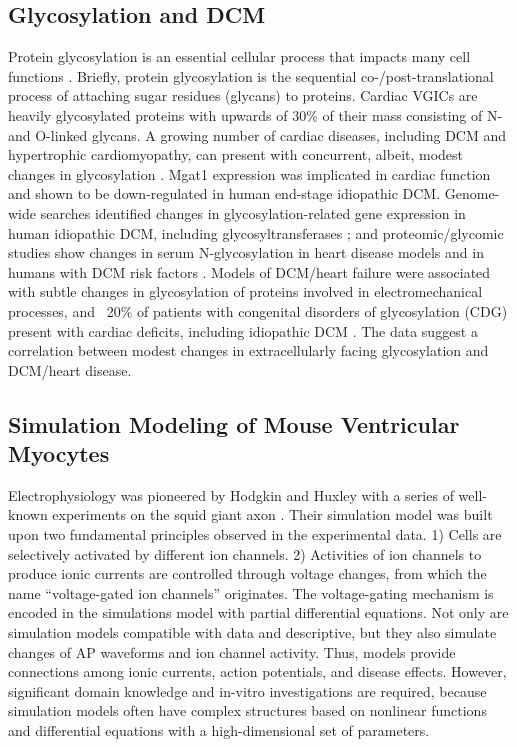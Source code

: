 \documentclass[10pt,letterpaper]{article}
\begin{document}
\subsection*{Glycosylation and DCM}
Protein glycosylation is an essential cellular process that impacts many cell functions \cite{marques2017cardiac}. Briefly, protein glycosylation is the sequential co-/post-translational process of attaching sugar residues (glycans) to proteins. Cardiac VGICs are heavily glycosylated proteins with upwards of 30\% of their mass consisting of N- and O-linked glycans. A growing number of cardiac diseases, including DCM and hypertrophic cardiomyopathy, can present with concurrent, albeit, modest changes in glycosylation \cite{gehrmann2003cardiomyopathy, footitt2009cardiomyopathy, marques2017cardiac}. Mgat1 expression was implicated in cardiac function and shown to be down-regulated in human end-stage idiopathic DCM. Genome-wide searches identified changes in glycosylation-related gene expression in human idiopathic DCM, including glycosyltransferases \cite{barrans2002global, hwang2002microarray, yung2004gene}; and proteomic/glycomic studies show changes in serum N-glycosylation in heart disease models and in humans with DCM risk factors \cite{nishio1995identification, knezevic2009variability, miura2016glycomics, nagai2016aberrant, yang2015glycoproteins}. Models of DCM/heart failure were associated with subtle changes in glycosylation of proteins involved in electromechanical processes, and ~20\% of patients with congenital disorders of glycosylation (CDG) present with cardiac deficits, including idiopathic DCM \cite{gehrmann2003cardiomyopathy, marques2017cardiac}. The data suggest a correlation between modest changes in extracellularly facing glycosylation and DCM/heart disease. 

\subsection*{Simulation Modeling of Mouse Ventricular Myocytes}
Electrophysiology was pioneered by Hodgkin and Huxley with a series of well-known experiments on the squid giant axon \cite{hodgkin1952quantitative}. Their simulation model was built upon two fundamental principles observed in the experimental data. 1) Cells are selectively activated by different ion channels. 2) Activities of ion channels to produce ionic currents are controlled through voltage changes, from which the name ``voltage-gated ion channels'' originates. The voltage-gating mechanism is encoded in the simulations model with partial differential equations. Not only are simulation models compatible with data and descriptive, but they also simulate changes of AP waveforms and ion channel activity. Thus, models provide connections among ionic currents, action potentials, and disease effects. However, significant domain knowledge and in-vitro investigations are required, because simulation models often have complex structures based on nonlinear functions and differential equations with a high-dimensional set of parameters.
\end{document}
